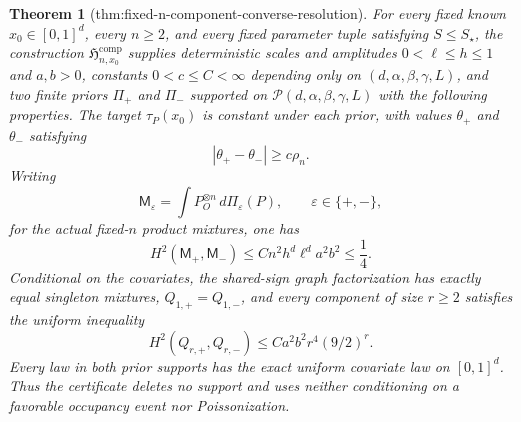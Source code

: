 \documentclass{article}
\newtheorem{theorem}{Theorem}
\begin{document}
\begin{theorem}[thm:fixed-n-component-converse-resolution]\label{thm:fixed-n-component-converse-resolution}
For every fixed known \(x_0\in[0,1]^d\), every \(n\ge2\), and every fixed parameter tuple satisfying \(S\le S_\star\), the construction \(\mathfrak H_{n,x_0}^{\mathrm{comp}}\) supplies deterministic scales and amplitudes \(0<\ell\le h\le1\) and \(a,b>0\), constants \(0<c\le C<\infty\) depending only on \((d,\alpha,\beta,\gamma,L)\), and two finite priors \(\Pi_+\) and \(\Pi_-\) supported on \(\mathcal P(d,\alpha,\beta,\gamma,L)\) with the following properties.  The target \(\tau_P(x_0)\) is constant under each prior, with values \(\theta_+\) and \(\theta_-\) satisfying
\[
 |\theta_+-\theta_-|\ge c\rho_n.
\]
Writing
\[
 \mathsf M_\varepsilon=\int P_O^{\otimes n}\,d\Pi_\varepsilon(P),
 \qquad \varepsilon\in\{+,-\},
\]
for the actual fixed-\(n\) product mixtures, one has
\[
 H^2(\mathsf M_+,\mathsf M_-)\le
 Cn^2h^d\ell^da^2b^2\le\frac14.
\]
Conditional on the covariates, the shared-sign graph factorization has exactly equal singleton mixtures, \(Q_{1,+}=Q_{1,-}\), and every component of size \(r\ge2\) satisfies the uniform inequality
\[
 H^2(Q_{r,+},Q_{r,-})\le Ca^2b^2r^4(9/2)^r.
\]
Every law in both prior supports has the exact uniform covariate law on \([0,1]^d\).  Thus the certificate deletes no support and uses neither conditioning on a favorable occupancy event nor Poissonization.
\end{theorem}
\end{document}
